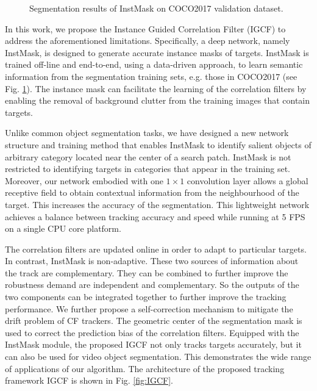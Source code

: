 \documentclass[review]{elsarticle}
\begin{document}
\begin{CJK*}{UTF8}{gbsn}
\begin{figure}
    \caption{Segmentation results of InstMask on COCO2017 \cite{Lin2014MicrosoftCC} validation dataset.}
    \label{fig:InstMask}
\end{figure}

In this work, we propose the Instance Guided Correlation Filter (IGCF) to address the aforementioned limitations. Specifically, a deep network, namely InstMask, is designed to generate accurate instance masks of targets. InstMask is trained off-line and end-to-end, using a data-driven approach, to learn semantic information from the segmentation training sets, e.g. those in COCO2017\cite{Lin2014MicrosoftCC} (see Fig. \ref{fig:InstMask}). The instance mask can facilitate the learning of the correlation filters by enabling the removal of background clutter from the training images that contain targets. 

Unlike common object segmentation tasks, we have designed a new network structure and training method that enables InstMask to identify salient objects of arbitrary category located near the center of a search patch. InstMask is not restricted to identifying targets in categories that appear in the training set. Moreover, our network embodied with one $1 \times 1$ convolution layer allows a global receptive field to obtain contextual information from the neighbourhood of the target. This increases the accuracy of the segmentation. This lightweight network achieves a balance between tracking accuracy and speed while running at 5 FPS on a single CPU core platform. 

The correlation filters are updated online in order to adapt to particular targets. In contrast, InstMask is non-adaptive. These two sources of information about the track are complementary. They can be combined to further improve the robustness demand are independent and complementary. So the outputs of the two components can be integrated together to further improve the tracking performance. We further propose a self-correction mechanism to mitigate the drift problem of CF trackers. The geometric center of the segmentation mask is used to correct the prediction bias of the correlation filters. Equipped with the InstMask module, the proposed IGCF not only tracks targets accurately, but it can also be used for video object segmentation. This demonstrates the wide range of applications of our algorithm. The architecture of the proposed tracking framework IGCF is shown in Fig. \ref{fig:IGCF}.


\end{CJK*}
\end{document}

